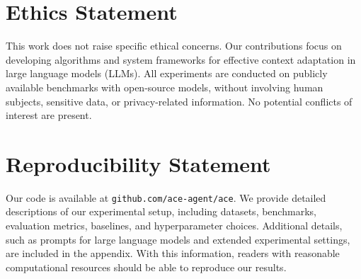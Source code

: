 \section*{Ethics Statement}

This work does not raise specific ethical concerns. 
Our contributions focus on developing algorithms and system frameworks for effective context adaptation in large language models (LLMs). 
All experiments are conducted on publicly available benchmarks with open-source models, without involving human subjects, sensitive data, or privacy-related information. 
No potential conflicts of interest are present.

\section*{Reproducibility Statement}

Our code is available at \texttt{github.com/ace-agent/ace}.
We provide detailed descriptions of our experimental setup, including datasets, benchmarks, evaluation metrics, baselines, and hyperparameter choices. 
Additional details, such as prompts for large language models and extended experimental settings, are included in the appendix. 
With this information, readers with reasonable computational resources should be able to reproduce our results.